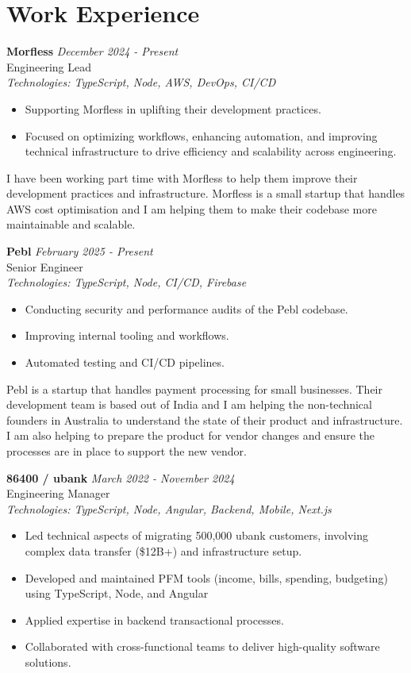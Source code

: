 \documentclass[a4paper,10pt]{article}
\begin{document}
\section*{Work Experience}

\textbf{Morfless} \hfill \textit{December 2024 - Present} \\
Engineering Lead \\
\textit{Technologies: TypeScript, Node, AWS, DevOps, CI/CD}
\begin{itemize}
    \item Supporting Morfless in uplifting their development practices.
    \item Focused on optimizing workflows, enhancing automation, and improving technical infrastructure to drive efficiency and scalability across engineering.
\end{itemize}

I have been working part time with Morfless to help them improve their development practices and infrastructure. 
Morfless is a small startup that handles AWS cost optimisation and 
I am helping them to make their codebase more maintainable and scalable.

\textbf{Pebl} \hfill \textit{February 2025 - Present} \\
Senior Engineer \\
\textit{Technologies: TypeScript, Node, CI/CD, Firebase}
\begin{itemize}
    \item Conducting security and performance audits of the Pebl codebase.
    \item Improving internal tooling and workflows.
    \item Automated testing and CI/CD pipelines.
\end{itemize}

Pebl is a startup that handles payment processing for small businesses. 
Their development team is based out of India and I am helping the non-technical founders in Australia to understand
the state of their product and infrastructure. I am also helping to prepare the product for vendor changes and ensure 
the processes are in place to support the new vendor.

\textbf{86400 / ubank} \hfill \textit{March 2022 - November 2024} \\
Engineering Manager \\
\textit{Technologies: TypeScript, Node, Angular, Backend, Mobile, Next.js}
\begin{itemize}
    \item Led technical aspects of migrating 500,000 ubank customers, involving complex data transfer (\$12B+) and infrastructure setup.
    \item Developed and maintained PFM tools (income, bills, spending, budgeting) using TypeScript, Node, and Angular
    \item Applied expertise in  backend transactional processes.
    \item Collaborated with cross-functional teams to deliver high-quality software solutions.
\end{itemize}
\end{document}
